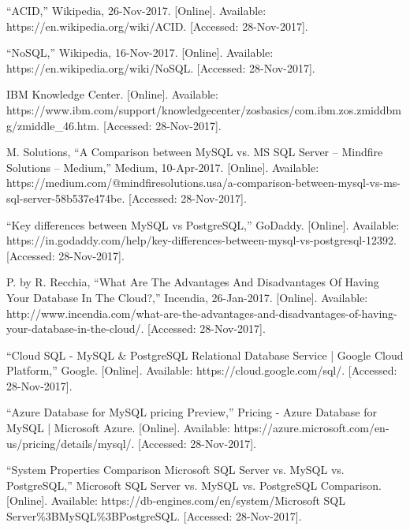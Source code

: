 \documentclass[onecolumn, draftclsnofoot,10pt, compsoc]{IEEEtran}
\begin{document}
\begin{thebibliography}{9}

\bibitem “ACID,” Wikipedia, 26-Nov-2017. [Online]. Available: https://en.wikipedia.org/wiki/ACID. [Accessed: 28-Nov-2017].

\bibitem “NoSQL,” Wikipedia, 16-Nov-2017. [Online]. Available: https://en.wikipedia.org/wiki/NoSQL. [Accessed: 28-Nov-2017].

\bibitem IBM Knowledge Center. [Online]. Available: https://www.ibm.com/support/knowledgecenter/zosbasics/com.ibm.zos.zmiddbmg/zmiddle\_46.htm. [Accessed: 28-Nov-2017].

\bibitem M. Solutions, “A Comparison between MySQL vs. MS SQL Server – Mindfire Solutions – Medium,” Medium, 10-Apr-2017. [Online]. Available: https://medium.com/@mindfiresolutions.usa/a-comparison-between-mysql-vs-ms-sql-server-58b537e474be. [Accessed: 28-Nov-2017].

\bibitem “Key differences between MySQL vs PostgreSQL,” GoDaddy. [Online]. Available: https://in.godaddy.com/help/key-differences-between-mysql-vs-postgresql-12392. [Accessed: 28-Nov-2017].

\bibitem P. by R. Recchia, “What Are The Advantages And Disadvantages Of Having Your Database In The Cloud?,” Incendia, 26-Jan-2017. [Online]. Available: http://www.incendia.com/what-are-the-advantages-and-disadvantages-of-having-your-database-in-the-cloud/. [Accessed: 28-Nov-2017].

\bibitem “Cloud SQL - MySQL & PostgreSQL Relational Database Service  |  Google Cloud Platform,” Google. [Online]. Available: https://cloud.google.com/sql/. [Accessed: 28-Nov-2017].

\bibitem “Azure Database for MySQL pricing Preview,” Pricing - Azure Database for MySQL | Microsoft Azure. [Online]. Available: https://azure.microsoft.com/en-us/pricing/details/mysql/. [Accessed: 28-Nov-2017].

\bibitem “System Properties Comparison Microsoft SQL Server vs. MySQL vs. PostgreSQL,” Microsoft SQL Server vs. MySQL vs. PostgreSQL Comparison. [Online]. Available: https://db-engines.com/en/system/Microsoft SQL Server\%3BMySQL\%3BPostgreSQL. [Accessed: 28-Nov-2017].
\end{thebibliography}
\end{document}
